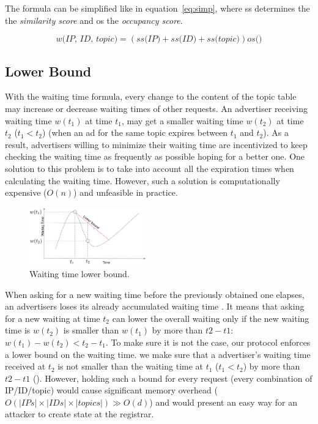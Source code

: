 The formula can be simplified like in equation~\ref{eq:simp}, where ss determines the the \emph{similarity score} and os the \emph{occupancy score}.

\begin{equation}
\label{eq:simp}
    \textit{w(IP, ID, topic)} = 
    (\textit{ss(IP)} + 
    \textit{ss(ID)} + 
    \textit{ss(topic)})
    \textit{os()}
\end{equation}

\subsection{Lower Bound}
With the waiting time formula, every change to the content of the topic table may increase or decrease waiting times of other requests. An advertiser receiving waiting time $w(t_1)$ at time $t_1$, may get a smaller waiting time $w(t_2)$ at time $t_2$ ($t_1 < t_2$) (\eg when an ad for the same topic expires between $t_1$ and $t_2$). As a result, advertisers willing to minimize their waiting time are incentivized to keep checking the waiting time as frequently as possible hoping for a better one.
One solution to this problem is to take into account all the expiration times when calculating the waiting time. However, such a solution is computationally expensive (\eg $O(n)$) and unfeasible in practice.

\begin{figure}
    \includegraphics[width=0.45\textwidth]{img/lower_bound.png}
    \caption{Waiting time lower bound.}
    \label{fig:lower_bound}
\end{figure}

When asking for a new waiting time before the previously obtained one elapses, an advertisers loses its already accumulated waiting time . It means that asking for a new waiting at time $t_2$ can lower the overall waiting only if the new waiting time is $w(t_2)$ is smaller than $w(t_1)$ by more than $t2 - t1$: $w(t_1) - w(t_2) < t_2 - t_1$.
To make sure it is not the case, our protocol enforces a lower bound on the waiting time. \Ie we make sure that a advertiser's waiting time received at $t_2$ is not smaller than the waiting time at $t_1$ ($t_1 < t_2$) by more than $t2 - t1$ (). However, holding such a bound for every request (\ie every combination of IP/ID/topic) would cause significant memory overhead ($O(|IPs|\times|IDs|\times|topics|)  \gg O(d)$) and would present an easy way for an attacker to create state at the registrar. 


